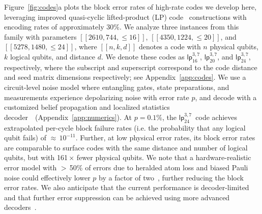 \documentclass[reprint,twocolumn,secnumarabic,amssymb, aps, prx]{revtex4-2}
\newcommand{\lpmemsmallparams}{\mbox{$[[2610, 744, \leq 16]]$}}
\newcommand{\lpmemmedparams}{\mbox{$[[4350, 1224, \leq 20]]$}}
\newcommand{\lpmemlargeparams}{\mbox{$[[5278, 1480, \leq 24]]$}}
\newcommand{\lpmemlarge}{\mbox{$\mathsf{lp}_{24}^{3, 7}$}}
\newcommand{\lpmemmed}{\mbox{$\mathsf{lp}^{3, 7}_{20}$}}
\newcommand{\lpmemsmall}{\mbox{$\mathsf{lp}^{3, 7}_{16}$}}
\begin{document}
Figure~\ref{fig:codes}a plots the block error rates of high-rate codes we develop here, leveraging improved quasi-cyclic lifted-product (LP) code~\cite{panteleev2019degenerate} constructions with encoding rates of approximately $30\%$. We analyze three instances from this family with parameters $\lpmemsmallparams$, $\lpmemmedparams$, and $\lpmemlargeparams$, where $[[n, k, d]]$ denotes a code with $n$ physical qubits, $k$ logical qubits, and distance $d$. We denote these codes as \lpmemsmall, \lpmemmed, and \lpmemlarge, respectively, where the subscript and superscript correspond to the code distance and seed matrix dimensions respectively; see Appendix~\ref{app:codes}. We use a circuit-level noise model where entangling gates, state preparations, and measurements experience depolarizing noise with error rate $p$, and decode with a customized belief propagation and localized statistics decoder~\cite{hillmann2024localized}~(Appendix~\ref{app:numerics}). At \mbox{$p=0.1\%$}, the \lpmemlarge\ code achieves extrapolated per-cycle block failure rates (i.e. the probability that any logical qubit fails) of  $\approx$\,$10^{-11}$. Further, at low physical error rates, its block error rates are comparable to surface codes with the same distance and number of logical qubits, but with 161\,$\times$ fewer physical qubits. We note that a hardware-realistic error model with $>$\,50\% of errors due to heralded atom loss and biased Pauli noise could effectively lower $p$ by a factor of two~\cite{wu2022erasure,sahay2023high,kubica2023erasure,yu2024processing,chang2024surface,perrin2024quantum, baranes2025leveraging, gu2025fault, bluvstein2025architectural}, further reducing the block error rates. We also anticipate that the current performance is decoder-limited and that further error suppression can be achieved using more advanced decoders~\cite{muller2025improved, senior2026scalable, maan2026decoding, ataides2025neural}.
\end{document}
